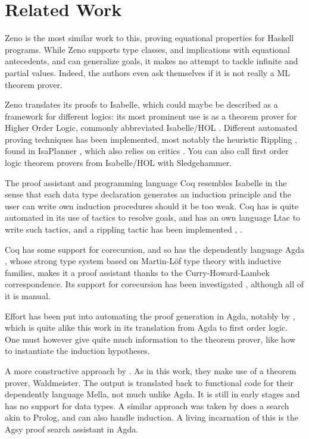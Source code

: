 \section{Related Work}

Zeno \citep{zeno} is the most similar work to this, proving equational
properties for Haskell programs. While Zeno supports type classes, and
implications with equational antecedents, and can generalize goals, it
makes no attempt to tackle infinite and partial values. Indeed, the
authors even ask themselves if it is not really a ML theorem prover.

Zeno translates its
proofs to Isabelle, which could maybe be described as a framework for
different logics: its most prominent use is as a theorem prover for
Higher Order Logic, commonly abbreviated Isabelle/HOL
\citep{isabelbook}. Different automated proving techniques has been
implemented, most notably the heuristic Rippling \citep{dixonphd},
found in IsaPlanner \citep{isaplanner}, which also relies on critics
\citep{productiveuse}. You can also call first order logic theorem
provers from Isabelle/HOL with Sledgehammer.

The proof assistant and programming language Coq resembles Isabelle in
the sense that each data type declaration generates an induction
principle and the user can write own induction procedures should it be
too weak. Coq has is quite automated in its use of tactics to resolve
goals, and has an own language Ltac to write such tactics, and a
rippling tactic has been implemented \citep{automateddtfp},
\citep{inductioncoq}.

Coq has some support for corecursion, and so has the dependently
language Agda \citep{norell:thesis}, whose strong type system based on
Martin-Löf type theory \citep{mltt} with inductive families, makes it a proof
assistant thanks to the Curry-Howard-Lambek correspondence. Its
support for corecursion has been investigated \citep{productivity},
although all of it is manual.

Effort has been put into automating the proof generation in Agda,
notably by \cite{agdaatp}, which is quite alike this work in its
translation from Agda to first order logic. One must however give
quite much information to the theorem prover, like how to instantiate
the induction hypotheses. %

A more constructive approach by \cite{dtatp}. As in this work, they
make use of a theorem prover, Waldmeister. The output is translated
back to functional code for their dependently language Mella, not much
unlike Agda. It is still in early stages and has no support for data
types. A similar approach was taken by \cite{agsy} does a search akin
to Prolog, and can also handle induction. A living incarnation of this
is the Agsy proof search assistant in Agda.

